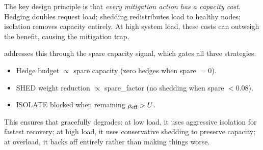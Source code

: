 The key design principle is that \emph{every mitigation action has a
capacity cost}. Hedging doubles request load; shedding redistributes
load to healthy nodes; isolation removes capacity entirely. At high
system load, these costs can outweigh the benefit, causing the
mitigation trap.

\system{} addresses this through the spare capacity signal, which gates
all three strategies:
\begin{itemize}
\item Hedge budget $\propto$ spare capacity (zero hedges when spare $= 0$).
\item SHED weight reduction $\propto$ spare\_factor (no shedding when
  spare $< 0.08$).
\item ISOLATE blocked when remaining $\rho_{\text{eff}} > U$.
\end{itemize}

This ensures that \system{} gracefully degrades: at low load, it uses
aggressive isolation for fastest recovery; at high load, it uses
conservative shedding to preserve capacity; at overload, it backs off
entirely rather than making things worse.

